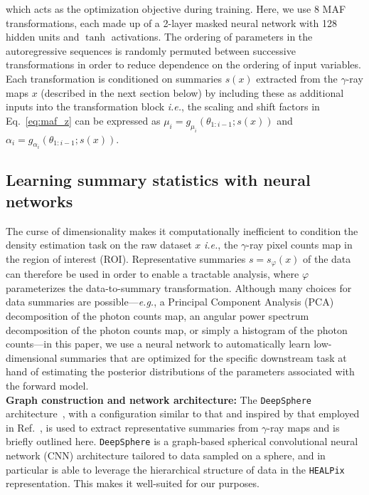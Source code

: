 \documentclass[prd,aps,10pt,nofootinbib,twocolumn,superscriptaddress,preprintnumbers,balancelastpage,longbibliography]{revtex4-1}
\begin{document}
which acts as the optimization objective during training. Here, we use 8 MAF transformations, each made up of a 2-layer masked neural network with 128 hidden units and $\tanh$ activations. The ordering of parameters in the autoregressive sequences is randomly permuted between successive transformations in order to reduce dependence on the ordering of input variables. Each transformation is conditioned on summaries $s(x)$ extracted from the $\gamma$-ray maps $x$ (described in the next section below) by including these as additional inputs into the transformation block \emph{i.e.}, the scaling and shift factors in Eq.~\eqref{eq:maf_z} can be expressed as $\mu_{i}=g_{\mu_{i}}\left({\theta}_{1: i-1} ; {s(x)}\right)$ and $\alpha_i = g_{\alpha_{i}}\left({\theta}_{1: i-1} ; {s(x)}\right)$.

\subsection{Learning summary statistics with neural networks}

The curse of dimensionality makes it computationally inefficient to condition the density estimation task on the raw dataset $x$ \emph{i.e.}, the $\gamma$-ray pixel counts map in the region of interest (ROI). Representative summaries $s = s_\varphi(x)$ of the data can therefore be used in order to enable a tractable analysis, where $\varphi$ parameterizes the data-to-summary transformation. Although many choices for data summaries are possible---\emph{e.g.}, a Principal Component Analysis (PCA) decomposition of the photon counts map, an angular power spectrum decomposition of the photon counts map, or simply a histogram of the photon counts---in this paper, we use a neural network to automatically learn low-dimensional summaries that are optimized for the specific downstream task at hand of estimating the posterior distributions of the parameters associated with the forward model. \\

\noindent
\textbf{Graph construction and network architecture:}
The \texttt{DeepSphere} architecture~\cite{defferrard2020deepsphere,Perraudin:2018rbt,deepsphere_rlgm}, with a configuration similar to that and inspired by that employed in Ref.~\cite{List:2020mzd}, is used to extract representative summaries from $\gamma$-ray maps and is briefly outlined here. \texttt{DeepSphere} is a graph-based spherical convolutional neural network (CNN) architecture tailored to data sampled on a sphere, and in particular is able to leverage the hierarchical structure of data in the \texttt{HEALPix} representation. This makes it well-suited for our purposes.
\end{document}
